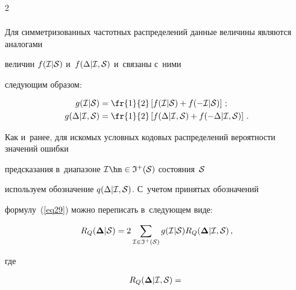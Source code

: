 \begin{multicols}{2}
\begin{align*}
\end{align*}

Для симметризованных частотных распределений данные величины являются аналогами 

величин $f({\cal I}|{\cal S})$ и~$f(\Delta|{\cal I},{\cal S})$ и~связаны с~ними 

сле\-ду\-ющим образом:



\noindent

\begin{align*}

g({\cal I}|{\cal S}) &= \fr{1}{2} \left[ 

f({\cal I}|{\cal S}) + f(-{\cal I}|{\cal S}) \right]\,; \\

g(\Delta|{\cal I},{\cal S}) &=

\fr{1}{2} \left[ f(\Delta|{\cal I},{\cal S}) + f(-\Delta|{\cal I},{\cal S}) \right]\,.

\end{align*}

Как и~ранее, для искомых условных кодовых распределений вероятности значений ошибки 

предсказания в~диапазоне ${\cal I}\hm\in{\frak I}^+({\cal S})$ состояния~${\cal S}$ 

использу\-ем обозначение $q(\Delta|{\cal I},{\cal S})$. С~учетом принятых обозначений 

формулу~(\ref{eq29}) можно переписать в~следующем виде:

\begin{equation}

\label{eq32}

R_Q(\boldsymbol{\Delta}|{\cal S}) = 2 \sum\limits_{{\cal I}\in{\frak I}^+({\cal S})}

g({\cal I}|{\cal S}) R_Q(\boldsymbol{\Delta}|{\cal I},{\cal S})\,,

\end{equation}

где



\vspace*{-4pt}



\noindent

\begin{multline}

\label{eq33}

R_Q(\boldsymbol{\Delta}|{\cal I},{\cal S}) = {}\\


\end{multline}
\end{multicols}
